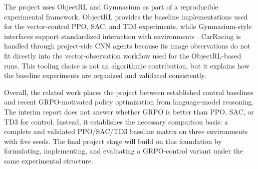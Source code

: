 The project uses ObjectRL and Gymnasium as part of a reproducible experimental framework. ObjectRL provides the baseline implementations used for the vector-control PPO, SAC, and TD3 experiments, while Gymnasium-style interfaces support standardized interaction with environments \citep{baykal2025objectrl,towers2024gymnasium}. CarRacing is handled through project-side CNN agents because its image observations do not fit directly into the vector-observation workflow used for the ObjectRL-based runs. This tooling choice is not an algorithmic contribution, but it explains how the baseline experiments are organized and validated consistently.

Overall, the related work places the project between established control baselines and recent GRPO-motivated policy optimization from language-model reasoning. The interim report does not answer whether GRPO is better than PPO, SAC, or TD3 for control. Instead, it establishes the necessary comparison basis: a complete and validated PPO/SAC/TD3 baseline matrix on three environments with five seeds. The final project stage will build on this foundation by formulating, implementing, and evaluating a GRPO-control variant under the same experimental structure.
